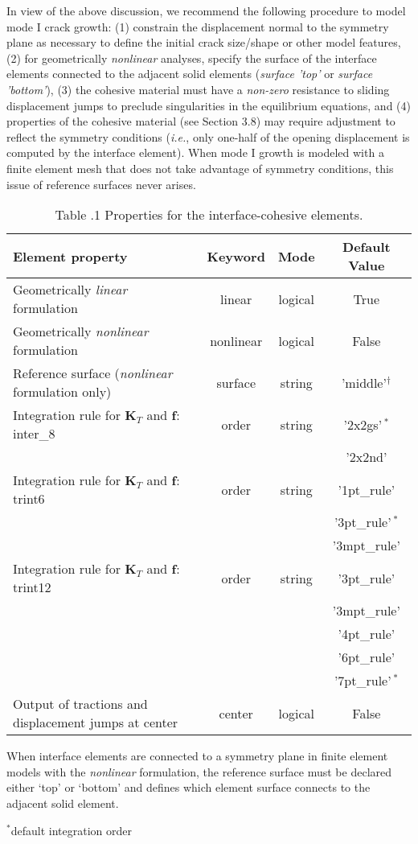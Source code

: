 \documentclass[11pt]{report}
\numberwithin{equation}{section}
\newcommand{\bmf } {\boldsymbol }  %
\newcommand{\ie}{\emph{i.e.},\xspace}
\newcommand{\ti}{\emph}
\begin{document}
In view of the above discussion, we recommend the following procedure to 
model mode I crack growth: (1) constrain the displacement normal to 
the symmetry plane as necessary to define the initial crack size/shape
or other model features,
(2) for geometrically \ti{nonlinear} analyses, specify the surface 
of the interface elements connected to the adjacent solid elements
(\ti{surface 'top' }or \ti{surface 'bottom'}), (3) the cohesive material
must have a \ti{non-zero} resistance to sliding displacement jumps to preclude
singularities in the equilibrium equations, and (4) properties of the 
cohesive material (see Section 3.8)
may require adjustment to reflect the symmetry conditions (\ie only
one-half of the opening displacement is computed by the interface element).
When mode I growth is modeled with a finite element mesh 
that does not take advantage of symmetry conditions, this 
issue of reference surfaces never arises. 
\begin{table}[htb]	
\centering
{
\setlength{\extrarowheight}{4pt}
\begin{tabular}{ | l | c |  c | c | }
\hline
Element property & Keyword & Mode & Default Value \\
\hline \hline
Geometrically \ti{linear} formulation &linear &logical  &True  \\ \hline
Geometrically \ti{nonlinear} formulation &nonlinear &logical  &False  \\ \hline
Reference surface (\ti{nonlinear} formulation only)	& surface& string	& 'middle'$^\dag$ \\ \hline
Integration rule for $\bmf{K}_T$  and $\bmf{f}$: inter\_8 & order & string & '2x2gs'$\,^*$ \\
 &&& '2x2nd' \\
  \hline
 Integration rule for $\bmf{K}_T$  and $\bmf{f}$: trint6 & order & string & '1pt\_rule' \\
  & & & '3pt\_rule'$\,^*$\\ 
 & & & '3mpt\_rule' \\ \hline
 Integration rule for $\bmf{K}_T$  and $\bmf{f}$: trint12 & order & string & '3pt\_rule' \\
   & & & '3mpt\_rule' \\ 
 & & & '4pt\_rule' \\
 & & & '6pt\_rule' \\
 & & & '7pt\_rule'$\,^*$ \\ \hline
 Output of tractions and displacement jumps at center & center& logical & False \\ \hline
\end{tabular}}

\small {
\vspace{0.1in}\dag When interface elements are connected to a symmetry plane
in finite element models with the \ti{nonlinear} formulation, the
reference surface must be declared either `top' or `bottom' and defines which element
surface connects to the adjacent solid element.

$^*$default integration order }
\normalsize
	
%
\caption{Table \thesection.1 
Properties for the interface-cohesive elements.}
\label{table:elem_props}
\end{table}
\end{document}
